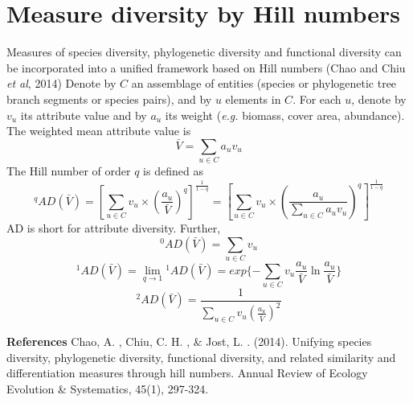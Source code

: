 \documentclass[11pt]{article}
\begin{document}
\section{Measure diversity by Hill numbers}
Measures of species diversity, phylogenetic diversity and functional diversity can be incorporated into a unified framework based on Hill numbers (Chao and Chiu \textit{et al}, 2014)
Denote by $C$ an assemblage of entities (species or phylogenetic tree branch segments or species pairs), and by $u$ elements in $C$. 
For each $u$, denote by $v_u$ its attribute value and by $a_u$ its weight (\textit{e.g.} biomass, cover area, abundance). 
The weighted mean attribute value is
\begin{equation}
    \bar{V} = \sum\limits_{u\in C}a_uv_u
\end{equation}
The Hill number of order $q$ is defined as 
\begin{equation}
    ^{q}AD(\bar{V}) = 
    [\sum\limits_{u\in C} v_u \times (\frac{a_u}{\bar{V}})^q]^{\frac{1}{1-q}} = [\sum\limits_{u\in C} v_u \times (\frac{a_u}{\sum\limits_{u\in C}a_uv_u})^q]^{\frac{1}{1-q}}
\end{equation}
AD is short for attribute diversity. 
Further, 
\begin{equation}
    ^{0}AD(\bar{V}) = \sum\limits_{u\in C}v_u
\end{equation}
\begin{equation}
    ^{1}AD(\bar{V}) = \lim\limits_{q\rightarrow 1}{^{1}AD(\bar{V})} = exp\{-\sum\limits_{u\in C}v_u\frac{a_u}{\bar{V}}\ln\frac{a_u}{\bar{V}}\} 
\end{equation}
\begin{equation}
    ^{2}AD(\bar{V}) = \frac{1}{\sum\limits_{u\in C}v_u (\frac{a_u}{\bar{V}})^2}
\end{equation}

\newline



\newpage
\textbf{References} %
\newline
[1] Chao, A. , Chiu, C. H. , & Jost, L. . (2014). Unifying species diversity, phylogenetic diversity, functional diversity, and related similarity and differentiation measures through hill numbers. Annual Review of Ecology Evolution & Systematics, 45(1), 297-324.
\end{document}
